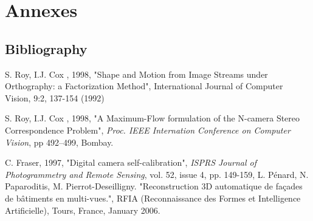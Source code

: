 \documentclass[a4paper]{book}
\begin{document}

\part{Annexes}

\appendix

\chapter{Bibliography}


\begin{thebibliography}{AAA}
      S. Roy, I.J. Cox , 1998, "Shape and Motion from Image 
            Streams under Orthography: a Factorization Method", International Journal of Computer Vision, 
            9:2, 137-154 (1992)


      S. Roy, I.J. Cox , 1998, "A Maximum-Flow
            formulation of the N-camera Stereo Correspondence
      Problem", \emph{Proc. IEEE Internation Conference on
      Computer Vision}, pp 492--499, Bombay.

     C. Fraser, 1997, "Digital camera self-calibration",
   \emph{ISPRS Journal of Photogrammetry and Remote Sensing}, vol. 52, issue 4, pp. 149-159,
      L. Pénard, N. Paparoditis, M. Pierrot-Deseilligny.
           "Reconstruction 3D automatique de façades de bâtiments en multi-vues.",
            RFIA (Reconnaissance des Formes et Intelligence Artificielle),
            Tours, France, January 2006.
\end{thebibliography}


\printindex
\end{document}

